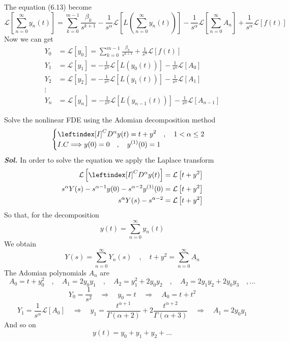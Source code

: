 The equation (6.13) become 
\[
    \mathcal{L}\left[\sum_{n=0}^{\infty} y_n(t)\right] = \sum_{k=0}^{m-1} \frac{\beta_k}{s^{k+1}} - \frac{1}{s^{\alpha}} \mathcal{L}\left[L\left(\sum_{n=0}^{\infty} y_n(t)\right)\right] - \frac{1}{s^{\alpha}}\mathcal{L}\left[\sum_{n=0}^{\infty} A_n\right] + \frac{1}{s^{\alpha}}\mathcal{L}\left[f(t)\right]
\]
Now we can get 
\begin{align*}
    Y_0 &= \mathcal{L}\left[y_0\right] = \sum_{k=0}^{m-1} \frac{\beta_k}{s^{k+1}} + \frac{1}{s^{\alpha}}\mathcal{L}\left[f(t)\right]
    \\
    Y_1 &= \mathcal{L}\left[y_1\right] = - \frac{1}{s^{\alpha}} \mathcal{L}\left[L\left(y_0(t)\right)\right] - \frac{1}{s^{\alpha}}\mathcal{L}\left[ A_0\right]
    \\
    Y_2 &= \mathcal{L}\left[y_2\right] = - \frac{1}{s^{\alpha}} \mathcal{L}\left[L\left(y_1(t)\right)\right] - \frac{1}{s^{\alpha}}\mathcal{L}\left[ A_1\right]
    \\
    \vdots
    \\
    Y_n &= \mathcal{L}\left[y_n\right] = - \frac{1}{s^{\alpha}} \mathcal{L}\left[L\left(y_{n-1}(t)\right)\right] - \frac{1}{s^{\alpha}}\mathcal{L}\left[ A_{n-1}\right]
\end{align*}
\begin{example}
    Solve the nonlinear FDE using the Adomian decomposition method
    \[
        \begin{cases}
            \displaystyle \leftindex[I]^C {D^{\alpha}} y(t) = t + y^2 \quad,\quad 1<\alpha \leq 2
            \\
            I.C \Longrightarrow \displaystyle y(0) = 0 \quad,\quad y^{(1)}(0) = 1
        \end{cases}
    \]
    \textit{ \textbf{Sol.} } In order to solve the equation we apply the Laplace transform
    \begin{align*}
        \mathcal{L}\left[\leftindex[I]^C {D^{\alpha}} y(t)\right] &= \mathcal{L}\left[t + y^2\right]
        \\
        s^{\alpha} Y(s) - s^{\alpha-1}y(0) - s^{\alpha-2} y^{(1)}(0) &= \mathcal{L}\left[t + y^2\right]
        \\
        s^{\alpha} Y(s) - s^{\alpha-2} &= \mathcal{L}\left[t + y^2\right]
    \end{align*}
    So that, for the decomposition
    \[
        y(t) = \sum_{n=0}^{\infty} y_n(t)
    \]
    We obtain
    \[
        Y(s) = \sum_{n=0}^{\infty} Y_n(s) \quad , \quad t+y^2 = \sum_{n=0}^{\infty} A_n
    \]
    The Adomian polynomials $A_n$ are 
    \[
        A_0 = t + y_0^2 \quad,\quad A_1 = 2y_0y_1 \quad,\quad A_2 = y_1^2 + 2y_0y_2 \quad,\quad A_2 = 2y_1y_2 + 2y_0y_3 \quad,\dots
    \]
    \[
        Y_0 = \frac{1}{s^2} \quad\Longrightarrow\quad y_0 = t \quad\Longrightarrow\quad A_0 = t+t^2
    \]
    \[
        Y_1 = \frac{1}{s^\alpha}\mathcal{L}\left[A_0\right] \quad\Longrightarrow\quad y_1 = \frac{t^{\alpha+1}}{\Gamma(\alpha+2)} + 2\frac{t^{\alpha+2}}{\Gamma(\alpha+3)} \quad\Longrightarrow\quad A_1 = 2y_0y_1
    \]
    And so on 
    \[
        y(t) = y_0 + y_1 + y_2 + \dots
    \]
\end{example}


